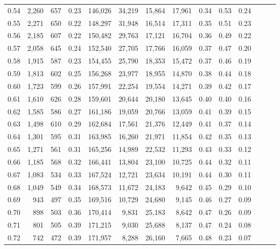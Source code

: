 \begin{tabular}{rrrrrrrrrrrrrr}
0.54 &  2,260 &  657 &  0.23 &  146,026 &   34,219 &  15,864 &  17,961 &  0.34 &  0.53 &      0.24 \\
0.55 &  2,271 &  650 &  0.22 &  148,297 &   31,948 &  16,514 &  17,311 &  0.35 &  0.51 &      0.23 \\
0.56 &  2,185 &  607 &  0.22 &  150,482 &   29,763 &  17,121 &  16,704 &  0.36 &  0.49 &      0.22 \\
0.57 &  2,058 &  645 &  0.24 &  152,540 &   27,705 &  17,766 &  16,059 &  0.37 &  0.47 &      0.20 \\
0.58 &  1,915 &  587 &  0.23 &  154,455 &   25,790 &  18,353 &  15,472 &  0.37 &  0.46 &      0.19 \\
0.59 &  1,813 &  602 &  0.25 &  156,268 &   23,977 &  18,955 &  14,870 &  0.38 &  0.44 &      0.18 \\
0.60 &  1,723 &  599 &  0.26 &  157,991 &   22,254 &  19,554 &  14,271 &  0.39 &  0.42 &      0.17 \\
0.61 &  1,610 &  626 &  0.28 &  159,601 &   20,644 &  20,180 &  13,645 &  0.40 &  0.40 &      0.16 \\
0.62 &  1,585 &  586 &  0.27 &  161,186 &   19,059 &  20,766 &  13,059 &  0.41 &  0.39 &      0.15 \\
0.63 &  1,498 &  610 &  0.29 &  162,684 &   17,561 &  21,376 &  12,449 &  0.41 &  0.37 &      0.14 \\
0.64 &  1,301 &  595 &  0.31 &  163,985 &   16,260 &  21,971 &  11,854 &  0.42 &  0.35 &      0.13 \\
0.65 &  1,271 &  561 &  0.31 &  165,256 &   14,989 &  22,532 &  11,293 &  0.43 &  0.33 &      0.12 \\
0.66 &  1,185 &  568 &  0.32 &  166,441 &   13,804 &  23,100 &  10,725 &  0.44 &  0.32 &      0.11 \\
0.67 &  1,083 &  534 &  0.33 &  167,524 &   12,721 &  23,634 &  10,191 &  0.44 &  0.30 &      0.11 \\
0.68 &  1,049 &  549 &  0.34 &  168,573 &   11,672 &  24,183 &   9,642 &  0.45 &  0.29 &      0.10 \\
0.69 &    943 &  497 &  0.35 &  169,516 &   10,729 &  24,680 &   9,145 &  0.46 &  0.27 &      0.09 \\
0.70 &    898 &  503 &  0.36 &  170,414 &    9,831 &  25,183 &   8,642 &  0.47 &  0.26 &      0.09 \\
0.71 &    801 &  505 &  0.39 &  171,215 &    9,030 &  25,688 &   8,137 &  0.47 &  0.24 &      0.08 \\
0.72 &    742 &  472 &  0.39 &  171,957 &    8,288 &  26,160 &   7,665 &  0.48 &  0.23 &      0.07 \\

\end{tabular}
